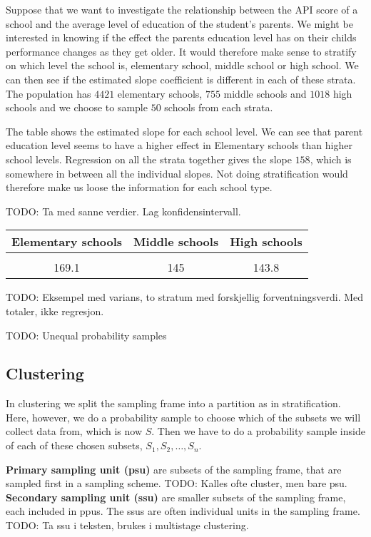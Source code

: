 \documentclass{article}
\begin{document}
\begin{example}
  Suppose that we want to investigate the relationship between the API score of
  a school and the average level of education of the student's parents. We might
  be interested in knowing if the effect the parents education level has on
  their childs performance changes as they get older. It would therefore make
  sense to stratify on which level the school is, elementary school, middle
  school or high school. We can then see if the estimated slope coefficient is
  different in each of these strata.
  The population has \(4421\) elementary schools, \(755\) middle schools and
  \(1018\) high schools and we choose to sample \(50\) schools from each strata.

  The table shows the estimated slope for each school level. We can see that
  parent education level seems to have a higher effect in Elementary schools
  than higher school levels. Regression on all the strata together gives the
  slope \(158\), which is somewhere in between all the individual slopes. Not
  doing stratification would therefore make us loose the information for each
  school type.

  TODO: Ta med sanne verdier. Lag konfidensintervall.

  \begin{tabular}{ccc}
    Elementary schools & Middle schools & High schools \\
    \hline \\
    169.1 & 145 & 143.8
  \end{tabular}
\end{example}

  TODO: Eksempel med varians, to stratum med forskjellig forventningsverdi. Med
  totaler, ikke regresjon.

  TODO: Unequal probability samples

\subsection{Clustering}

In clustering we split the sampling frame into a partition as in stratification.
Here, however, we do a probability sample to choose which of the subsets we will
collect data from, which is now \(S\). Then we have to do a probability sample
inside of each of these chosen subsets, \(S_1, S_2, \dots, S_n\).

\begin{definition}
 \textbf{Primary sampling unit (psu)} are subsets of the sampling frame, that
 are sampled first in a sampling scheme. TODO: Kalles ofte cluster, men bare psu. \\
 \textbf{Secondary sampling unit (ssu)} are smaller subsets of the sampling
 frame, each included in ppus. The ssus are often individual units in the
 sampling frame. TODO: Ta ssu i teksten, brukes i multistage clustering.
\end{definition}
\end{document}

